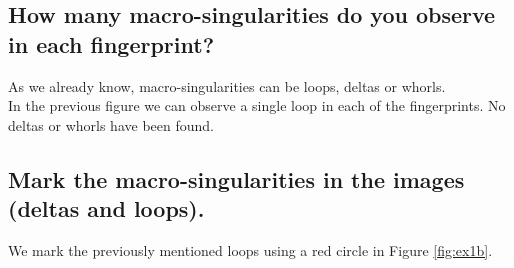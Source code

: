 \documentclass[a4paper]{article}
\begin{document}
\subsection{ How many macro-singularities do you observe in each fingerprint?}

As we already know, macro-singularities can be loops, deltas or whorls.\\

In the previous figure we can observe a single loop in each of the fingerprints. No deltas or whorls have been found.

\subsection{ Mark the macro-singularities in the images (deltas and loops).}

We mark the previously mentioned loops using a red circle in Figure \ref{fig:ex1b}.
\end{document}
